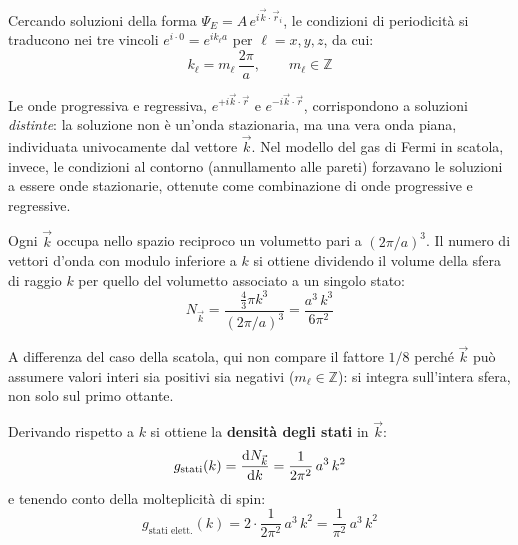 Cercando soluzioni della forma \(\Psi_E = A\, e^{i \vec{k} \cdot \vec{r}_i}\), le condizioni di periodicità si traducono nei tre vincoli \(e^{i \cdot 0} = e^{i k_\ell a}\) per \(\ell = x, y, z\), da cui:
\begin{equation}
    k_\ell = m_\ell\, \frac{2\pi}{a}, \qquad m_\ell \in \mathbb{Z}
\end{equation}

\begin{remark}
Le onde progressiva e regressiva, \(e^{+i\vec{k}\cdot\vec{r}}\) e \(e^{-i\vec{k}\cdot\vec{r}}\), corrispondono a soluzioni \emph{distinte}: la soluzione non è un'onda stazionaria, ma una vera onda piana, individuata univocamente dal vettore \(\vec{k}\). Nel modello del gas di Fermi in scatola, invece, le condizioni al contorno (annullamento alle pareti) forzavano le soluzioni a essere onde stazionarie, ottenute come combinazione di onde progressive e regressive.
\end{remark}

Ogni \(\vec{k}\) occupa nello spazio reciproco un volumetto pari a \((2\pi/a)^3\). Il numero di vettori d'onda con modulo inferiore a \(k\) si ottiene dividendo il volume della sfera di raggio \(k\) per quello del volumetto associato a un singolo stato:
\begin{equation}
    N_{\vec{k}} = \frac{\tfrac{4}{3}\pi k^3}{(2\pi/a)^3} = \frac{a^3\, k^3}{6\pi^2}
\end{equation}
\begin{remark}
A differenza del caso della scatola, qui non compare il fattore \(1/8\) perché \(\vec{k}\) può assumere valori interi sia positivi sia negativi (\(m_\ell \in \mathbb{Z}\)): si integra sull'intera sfera, non solo sul primo ottante.
\end{remark}

Derivando rispetto a \(k\) si ottiene la \textbf{densità degli stati} in \(\vec{k}\):
\begin{equation}
    g_{\text{stati}}(k) = \dv{N_{\vec{k}}}{k} = \frac{1}{2\pi^2}\, a^3\, k^2
\end{equation}
e tenendo conto della molteplicità di spin:
\begin{equation}
    g_{\text{stati elett.}}(k) = 2 \cdot \frac{1}{2\pi^2}\, a^3\, k^2 = \frac{1}{\pi^2}\, a^3\, k^2
\end{equation}


